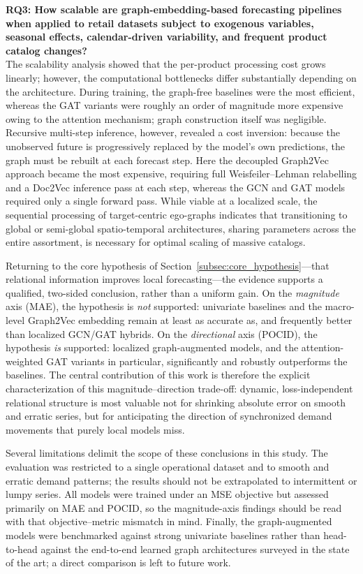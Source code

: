 \textbf{RQ3: How scalable are graph-embedding-based forecasting pipelines when
applied to retail datasets subject to exogenous variables, seasonal effects,
calendar-driven variability, and frequent product catalog changes?} \\
The scalability analysis showed that the per-product processing cost grows linearly; however, the computational bottlenecks differ substantially depending on the architecture. During
training, the graph-free baselines were the most efficient, whereas the GAT
variants were roughly an order of magnitude more expensive owing to the attention
mechanism; graph construction itself was negligible. Recursive
multi-step inference, however, revealed a cost inversion: because the unobserved
future is progressively replaced by the model's own predictions, the graph must be
rebuilt at each forecast step. Here the decoupled Graph2Vec approach became the
most expensive, requiring full Weisfeiler--Lehman relabelling and a Doc2Vec
inference pass at each step, whereas the GCN and GAT models required only a single
forward pass. While viable at a localized scale, the sequential processing of
target-centric ego-graphs indicates that transitioning to global or semi-global
spatio-temporal architectures, sharing parameters across the entire assortment, is
necessary for optimal scaling of massive catalogs.

Returning to the core hypothesis of Section~\ref{subsec:core_hypothesis}---that
relational information improves local forecasting---the evidence supports a
qualified, two-sided conclusion, rather than a uniform gain. On the \emph{magnitude}
axis (MAE), the hypothesis is \emph{not} supported: univariate baselines and the
macro-level Graph2Vec embedding remain at least as accurate as, and frequently
better than localized GCN/GAT hybrids. On the \emph{directional} axis (POCID),
the hypothesis \emph{is} supported: localized graph-augmented models, and the
attention-weighted GAT variants in particular, significantly and robustly
outperforms the baselines. The central contribution of this work is therefore the
explicit characterization of this magnitude--direction trade-off: dynamic,
loss-independent relational structure is most valuable not for shrinking absolute
error on smooth and erratic series, but for anticipating the direction of
synchronized demand movements that purely local models miss.

Several limitations delimit the scope of these conclusions in this study. The evaluation was
restricted to a single operational dataset and to smooth and erratic demand
patterns; the results should not be extrapolated to intermittent or lumpy series.
All models were trained under an MSE objective but assessed primarily on MAE and
POCID, so the magnitude-axis findings should be read with that
objective--metric mismatch in mind. Finally, the graph-augmented models were
benchmarked against strong univariate baselines rather than head-to-head against
the end-to-end learned graph architectures surveyed in the state of the art;
a direct comparison is left to future work.
